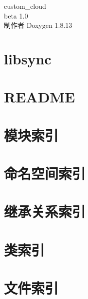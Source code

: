 \documentclass[twoside]{book}
\newcommand{\+}{\discretionary{\mbox{\scriptsize$\hookleftarrow$}}{}{}}
\newcommand{\clearemptydoublepage}{%
  \newpage{\pagestyle{empty}\cleardoublepage}%
}
\begin{document}
\hypersetup{pageanchor=false,
             bookmarksnumbered=true,
             pdfencoding=unicode
            }
\begin{titlepage}
\vspace*{7cm}
\begin{center}%
{\Large custom\+\_\+cloud \\[1ex]\large beta 1.\+0 }\\
\vspace*{1cm}
{\large 制作者 Doxygen 1.8.13}\\
\end{center}
\end{titlepage}
\clearemptydoublepage
{}
\tableofcontents
\clearemptydoublepage
{}
\hypersetup{pageanchor=true}

\chapter{libsync}
\label{md_bin__debug_test__xE7_x94_xB5_xE4_xBF_xA1_xE5_xAD_xA6_xE9_x99_xA2__xE9_xA1_xB9_xE7_x9B_xAE1__x53d3a404f905c03ef8768679d9e604c0}

\chapter{R\+E\+A\+D\+ME}
\label{md__r_e_a_d_m_e}

\chapter{模块索引}

\chapter{命名空间索引}

\chapter{继承关系索引}

\chapter{类索引}

\chapter{文件索引}

\end{document}
